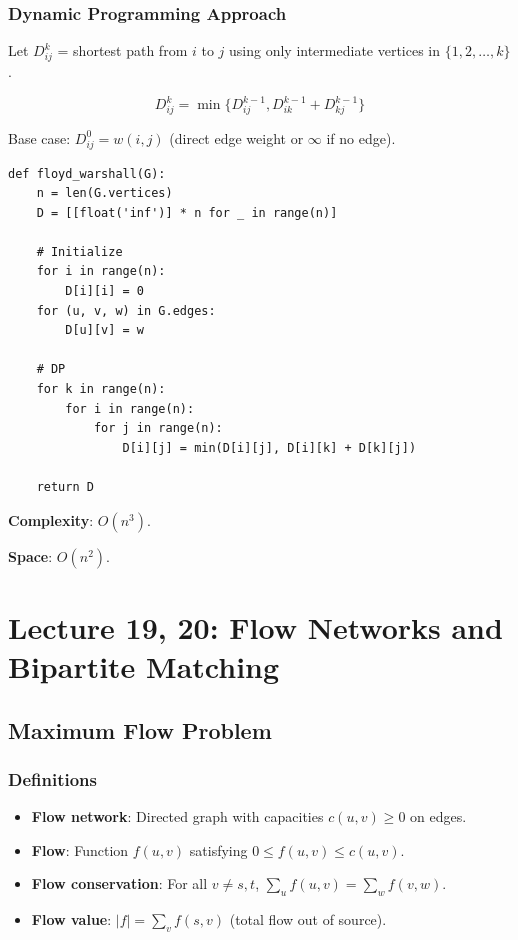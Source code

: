 \documentclass[11pt]{article}
\begin{document}
{{{\subsubsection*{Dynamic Programming Approach}
Let $D^k_{ij}$ = shortest path from $i$ to $j$ using only intermediate vertices in $\{1, 2, \ldots, k\}$.

\[
D^k_{ij} = \min\{D^{k-1}_{ij}, D^{k-1}_{ik} + D^{k-1}_{kj}\}
\]

Base case: $D^0_{ij} = w(i,j)$ (direct edge weight or $\infty$ if no edge).

\begin{lstlisting}
def floyd_warshall(G):
    n = len(G.vertices)
    D = [[float('inf')] * n for _ in range(n)]
    
    # Initialize
    for i in range(n):
        D[i][i] = 0
    for (u, v, w) in G.edges:
        D[u][v] = w
    
    # DP
    for k in range(n):
        for i in range(n):
            for j in range(n):
                D[i][j] = min(D[i][j], D[i][k] + D[k][j])
    
    return D
\end{lstlisting}

\textbf{Complexity}: $O(n^3)$.

\textbf{Space}: $O(n^2)$.

\section{Lecture 19, 20: Flow Networks and Bipartite Matching}

\subsection*{Maximum Flow Problem}

\subsubsection*{Definitions}
\begin{itemize}
\item \textbf{Flow network}: Directed graph with capacities $c(u,v) \ge 0$ on edges.
\item \textbf{Flow}: Function $f(u,v)$ satisfying $0 \le f(u,v) \le c(u,v)$.
\item \textbf{Flow conservation}: For all $v \ne s, t$, $\sum_u f(u,v) = \sum_w f(v,w)$.
\item \textbf{Flow value}: $|f| = \sum_v f(s,v)$ (total flow out of source).
\end{itemize}

}}}
\end{document}
